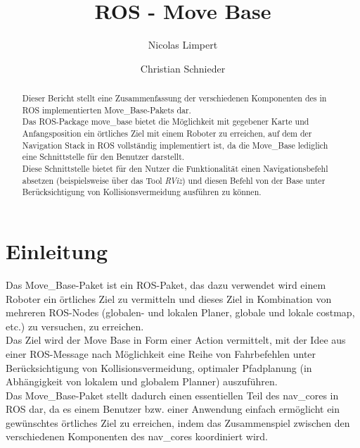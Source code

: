 \documentclass[oribibl]{llncs}
\begin{document}
 \title{ROS - Move Base}

\author{Nicolas Limpert \and Christian Schnieder} 

\maketitle


\begin{abstract} Dieser Bericht stellt eine Zusammenfassung der verschiedenen Komponenten des in ROS implementierten Move\_Base-Pakets dar.\\
Das ROS-Package move\_base bietet die Möglichkeit mit gegebener Karte und Anfangsposition ein örtliches Ziel mit einem Roboter zu erreichen, auf dem der Navigation Stack\cite{navigation} in ROS vollständig implementiert ist, da die Move\_Base lediglich eine Schnittstelle für den Benutzer darstellt.\\
Diese Schnittstelle bietet für den Nutzer die Funktionalität einen Navigationsbefehl absetzen (beispielsweise über das Tool \textit{RViz}) und diesen Befehl von der Base unter Berücksichtigung von Kollisionsvermeidung ausführen zu können.\end{abstract}

\section{Einleitung}
Das Move\_Base-Paket ist ein ROS-Paket, das dazu verwendet wird einem Roboter ein örtliches Ziel zu vermitteln und dieses Ziel in Kombination von mehreren ROS-Nodes (globalen- und lokalen Planer, globale und lokale costmap, etc.) zu versuchen, zu erreichen.\\
Das Ziel wird der Move Base in Form einer Action vermittelt, mit der Idee aus einer ROS-Message nach Möglichkeit eine Reihe von Fahrbefehlen unter Berücksichtigung von Kollisionsvermeidung, optimaler Pfadplanung (in Abhängigkeit von lokalem und globalem Planner) auszuführen.\\
Das Move\_Base-Paket stellt dadurch einen essentiellen Teil des nav\_cores in ROS dar, da es einem Benutzer bzw. einer Anwendung einfach ermöglicht ein gewünschtes örtliches Ziel zu erreichen, indem das Zusammenspiel zwischen den verschiedenen Komponenten des nav\_cores koordiniert wird.
\end{document}
